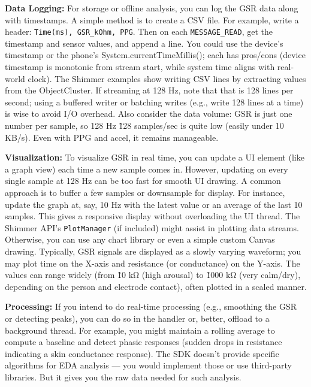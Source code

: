 {{\textbf{Data Logging:} For storage or offline analysis, you can log the GSR
data along with timestamps. A simple method is to create a CSV file. For
example, write a header: \texttt{Time(ms), GSR_kOhm, PPG}. Then on each
\texttt{MESSAGE_READ}, get the timestamp and sensor values, and append a line.
You could use the device's timestamp or the phone's
System.currentTimeMillis(); each has pros/cons (device timestamp is
monotonic from stream
start\cite{ContactlessStressThermal2022},
while system time aligns with real-world clock). The Shimmer examples
show writing CSV lines by extracting values from the
ObjectCluster\cite{ContactlessStressThermal2022}\cite{InstantStressSmartphone2019}.
If streaming at 128 Hz, note that that is 128 lines per second; using a
buffered writer or batching writes (e.g., write 128 lines at a time) is
wise to avoid I/O overhead. Also consider the data volume: GSR is just
one number per sample, so 128 Hz \~ 128 samples/sec is quite low (easily
under 10 KB/s). Even with PPG and accel, it remains manageable.

\textbf{Visualization:} To visualize GSR in real time, you can update a UI
element (like a graph view) each time a new sample comes in. However,
updating on every single sample at 128 Hz can be too fast for smooth UI
drawing. A common approach is to buffer a few samples or downsample for
display. For instance, update the graph at, say, 10 Hz with the latest
value or an average of the last 10 samples. This gives a responsive
display without overloading the UI thread. The Shimmer API's
\texttt{PlotManager} (if included) might assist in plotting data
streams\cite{InstantStressSmartphone2019}.
Otherwise, you can use any chart library or even a simple custom Canvas
drawing. Typically, GSR signals are displayed as a slowly varying
waveform; you may plot time on the X-axis and resistance (or
conductance) on the Y-axis. The values can range widely (from \~10 kΩ
(high arousal) to \~1000 kΩ (very calm/dry), depending on the person and
electrode contact), often plotted in a scaled manner.

\textbf{Processing:} If you intend to do real-time processing (e.g.,
smoothing the GSR or detecting peaks), you can do so in the handler or,
better, offload to a background thread. For example, you might maintain
a rolling average to compute a baseline and detect phasic responses
(sudden drops in resistance indicating a skin conductance response). The
SDK doesn't provide specific algorithms for EDA analysis --- you would
implement those or use third-party libraries. But it gives you the raw
data needed for such analysis.

}}
